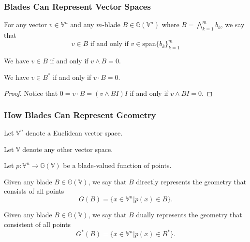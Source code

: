 \documentclass{beamer}
\newcommand{\G}{\mathbb{G}}
\newcommand{\V}{\mathbb{V}}
\begin{document}
\begin{frame}
\frametitle{Blades Can Represent Vector Spaces}
\begin{definition}
For any vector $v\in\V^n$ and any $m$-blade $B\in\G(\V^n)$ where $B=\bigwedge_{k=1}^m b_k$, we
say that
\begin{equation*}
\mbox{$v\in B$ if and only if $v\in\mbox{span}\{b_k\}_{k=1}^m$}
\end{equation*}
\end{definition}
\begin{lemma}
We have $v\in B$ if and only if $v\wedge B=0$.
\end{lemma}
\begin{lemma}
We have $v\in B^*$ if and only if $v\cdot B=0$.
\end{lemma}
\begin{proof}
Notice that $0=v\cdot B = (v\wedge BI)I$ if and only if $v\wedge BI=0$.
\end{proof}
\end{frame}


\begin{frame}
\frametitle{How Blades Can Represent Geometry}
Let $\V^n$ denote a \alert{Euclidean} vector space.

Let $\V$ denote any other vector space.

Let $p:\V^n\to\G(\V)$ be a blade-valued function of points.
\begin{definition}
Given any blade $B\in\G(\V)$, we say that $B$ \alert{directly} represents
the geometry that consists of all points
\begin{equation*}
G(B) = \{x\in\V^n|p(x)\in B\}.
\end{equation*}
\end{definition}
\begin{definition}
Given any blade $B\in\G(\V)$, we say that $B$ \alert{dually} represents
the geometry that consistent of all points
\begin{equation*}
G^*(B) = \{x\in\V^n|p(x)\in B^*\}.
\end{equation*}
\end{definition}
\end{frame}
\end{document}
